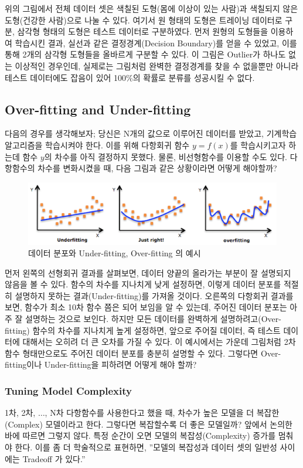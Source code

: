 \documentclass[a4paper]{oblivoir}
\begin{document}
\indent 위의 그림에서 전체 데이터 셋은 색칠된 도형(몸에 이상이 있는 사람)과 색칠되지 않은 도형(건강한 사람)으로 나눌 수 있다. 여기서 원 형태의 도형은 트레이닝 데이터로 구분, 삼각형 형태의 도형은 테스트 데이터로 구분하였다. 먼저 원형의 도형들을 이용하여 학습시킨 결과, 실선과 같은 결정경계(Decision Boundary)를 얻을 수 있었고, 이를 통해 2개의 삼각형 도형들을 올바르게 구분할 수 있다. 이 그림은 Outlier가 하나도 없는 이상적인 경우인데, 실제로는 그림처럼 완벽한 결정경계를 찾을 수 없을뿐만 아니라 테스트 데이터에도 잡음이 있어 100\%의 확률로 분류를 성공시킬 수 없다.

\subsection{Over-fitting and Under-fitting}
다음의 경우를 생각해보자; 당신은 N개의 값으로 이루어진 데이터를 받았고, 기계학습 알고리즘을 학습시켜야 한다. 이를 위해 다항회귀 함수 $y=f(x)$를 학습시키고자 하는데 함수 $y$의 차수를 아직 결정하지 못했다. 물론, 비선형함수를 이용할 수도 있다. 다항함수의 차수를 변화시켰을 때, 다음 그림과 같은 상황이라면 어떻게 해야할까?
\begin{figure}[ht]
\centering
\includegraphics[scale=0.5]{Over_Under_Fitting.png}
\caption{데이터 분포와 Under-fitting, Over-fitting 의 예시}
\label{Figure 6-2}
\end{figure}

\indent 먼저 왼쪽의 선형회귀 결과를 살펴보면, 데이터 양끝의 올라가는 부분이 잘 설명되지 않음을 볼 수 있다. 함수의 차수를 지나치게 낮게 설정하면, 이렇게 데이터 분포를 적절히 설명하지 못하는 결과(Under-fitting)를 가져올 것이다. 오른쪽의 다항회귀 결과를 보면, 함수가 최소 10차 함수 쯤은 되어 보임을 알 수 있는데, 주어진 데이터 분포는 아주 잘 설명하는 것으로 보인다. 하지만 모든 데이터를 완벽하게 설명하려고(Over-fitting) 함수의 차수를 지나치게 높게 설정하면, 앞으로 주어질 데이터, 즉 테스트 데이터에 대해서는 오히려 더 큰 오차를 가질 수 있다. 이 예시에서는 가운데 그림처럼 2차 함수 형태만으로도 주어진 데이터 분포를 충분히 설명할 수 있다. 그렇다면 Over-fitting이나 Under-fitting을 피하려면 어떻게 해야 할까?

\subsubsection{Tuning Model Complexity}
1차, 2차, $\dots$, N차 다항함수를 사용한다고 했을 때, 차수가 높은 모델을 더 복잡한(Complex) 모델이라고 한다. 그렇다면 복잡할수록 더 좋은 모델일까? 앞에서 논의한 바에 따르면 그렇지 않다. 특정 순간이 오면 모델의 복잡성(Complexity) 증가를 멈춰야 한다. 이를 좀 더 학술적으로 표현하면, ''모델의 복잡성과 데이터 셋의 일반성 사이에는 Tradeoff 가 있다.''
\end{document}
